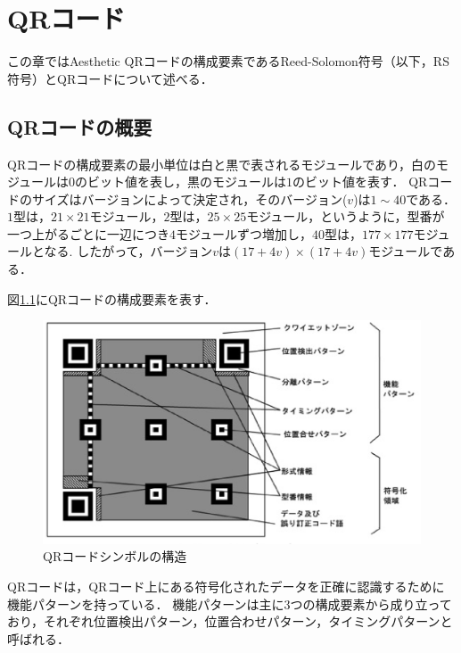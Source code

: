 \documentclass{thesis}
\begin{document}
\chapter{QRコード}
\label{chap:2}


この章ではAesthetic QRコードの構成要素であるReed-Solomon符号（以下，RS符号）とQRコードについて述べる．


\section{QRコードの概要}

QRコードの構成要素の最小単位は白と黒で表されるモジュールであり，白のモジュールは$0$のビット値を表し，黒のモジュールは$1$のビット値を表す．
QRコードのサイズはバージョンによって決定され，そのバージョン($v$)は$1\sim40$である．
$1$型は，$21\times21$モジュール，$2$型は，$25\times25$モジュール，というように，型番が一つ上がるごとに一辺につき$4$モジュールずつ増加し，$40$型は，$177\times177$モジュールとなる.
したがって，バージョン$v$は$(17+4v)\times(17+4v)$モジュールである．

図\ref{fig:qrcode_config}にQRコードの構成要素を表す． \\

\begin{figure}[H]
\centering
\includegraphics[width=15cm,clip]{pic/qrcode_config.eps}
\caption{QRコードシンボルの構造\cite{jis}}
\label{fig:qrcode_config}
\end{figure}

QRコードは，QRコード上にある符号化されたデータを正確に認識するために機能パターンを持っている．
機能パターンは主に3つの構成要素から成り立っており，それぞれ位置検出パターン，位置合わせパターン，タイミングパターンと呼ばれる．
\end{document}
